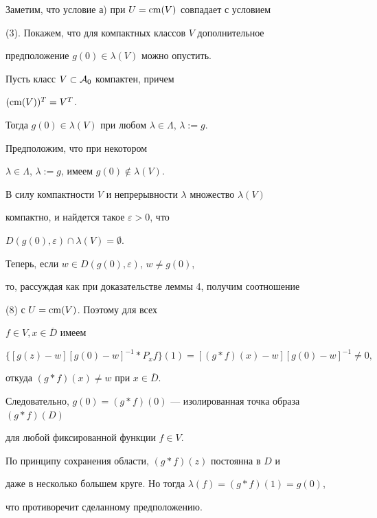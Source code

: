 Заметим, что условие а) при $U = \operatorname{cm} (V)$ совпадает с условием


(3). Покажем, что для компактных классов $V$ дополнительное 


предположение $g(0) \in \lambda(V)$ можно опустить.





\begin{lem}


Пусть класс $V \subset {\cal A}_0$ компактен, причем


$(\operatorname{cm} (V))^T = V^T$.


Тогда $g(0) \in \lambda(V)$ при любом $\lambda \in \Lambda$, $\lambda:=g$.


\end{lem}





\begin{pf}


Предположим, что при некотором 


$\lambda \in \Lambda$, $\lambda:=g$, имеем $g(0) \notin \lambda(V)$.


В силу компактности $V$ и непрерывности $\lambda$ множество $\lambda(V)$


компактно, и найдется такое $\varepsilon>0$, что 


$D(g(0),\varepsilon) \cap \lambda(V) = \emptyset$. 


Теперь, если $w \in D(g(0),\varepsilon)$, $w \neq g(0)$, 


то, рассуждая как при доказательстве леммы 4, получим соотношение 


(8) с $U = \operatorname{cm} (V)$. Поэтому для всех 


$f\in V, x \in \overline{D}$ имеем


$$


\{ [g(z)-w][g(0)-w]^{-1} *P_x f \}(1)= 


[(g*f)(x)-w][g(0)-w]^{-1} \neq 0,


$$


откуда $(g*f)(x) \neq w$ при $x \in \overline{D}$.


Следовательно, $g(0)=(g*f)(0)$ --- изолированная точка образа $(g*f)(D)$ 


для любой фиксированной функции $f\in V$. 


По принципу сохранения области, $(g*f)(z)$ постоянна в $D$ и


даже в несколько большем круге. Но тогда $\lambda(f) = (g*f)(1) = g(0)$,


что противоречит сделанному предположению.


\end{pf}






